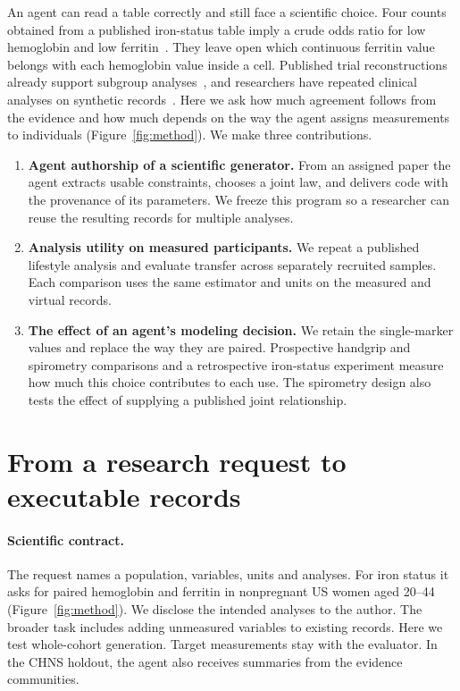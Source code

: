 \documentclass[sigconf,anonymous,review]{acmart}
\begin{document}
An agent can read a table correctly and still face a scientific choice. Four counts obtained from a published iron-status table imply a crude odds ratio for low hemoglobin and low ferritin~\cite{zhu}. They leave open which continuous ferritin value belongs with each hemoglobin value inside a cell. Published trial reconstructions already support subgroup analyses~\cite{synthipd}, and researchers have repeated clinical analyses on synthetic records~\cite{azizi}. Here we ask how much agreement follows from the evidence and how much depends on the way the agent assigns measurements to individuals (Figure~\ref{fig:method}). We make three contributions.
\begin{enumerate}
\item \textbf{Agent authorship of a scientific generator.} From an assigned paper the agent extracts usable constraints, chooses a joint law, and delivers code with the provenance of its parameters. We freeze this program so a researcher can reuse the resulting records for multiple analyses.
\item \textbf{Analysis utility on measured participants.} We repeat a published lifestyle analysis and evaluate transfer across separately recruited samples. Each comparison uses the same estimator and units on the measured and virtual records.
\item \textbf{The effect of an agent's modeling decision.} We retain the single-marker values and replace the way they are paired. Prospective handgrip and spirometry comparisons and a retrospective iron-status experiment measure how much this choice contributes to each use. The spirometry design also tests the effect of supplying a published joint relationship.
\end{enumerate}

\section{From a research request to executable records}
\label{sec:method}

\paragraph{Scientific contract.}
The request names a population, variables, units and analyses. For iron status it asks for paired hemoglobin and ferritin in nonpregnant US women aged 20--44 (Figure~\ref{fig:method}). We disclose the intended analyses to the author. The broader task includes adding unmeasured variables to existing records. Here we test whole-cohort generation. Target measurements stay with the evaluator. In the CHNS holdout, the agent also receives summaries from the evidence communities.
\end{document}
